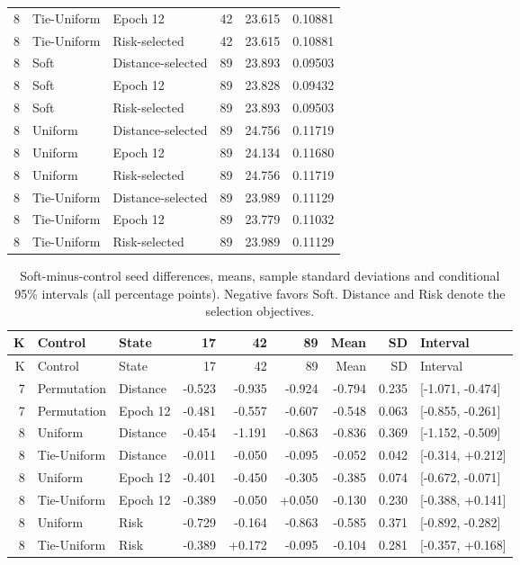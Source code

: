 \begin{longtable}{rlllrr}
8 & Tie-Uniform & Epoch 12 & 42 & 23.615 & 0.10881\\
8 & Tie-Uniform & Risk-selected & 42 & 23.615 & 0.10881\\
8 & Soft & Distance-selected & 89 & 23.893 & 0.09503\\
8 & Soft & Epoch 12 & 89 & 23.828 & 0.09432\\
8 & Soft & Risk-selected & 89 & 23.893 & 0.09503\\
8 & Uniform & Distance-selected & 89 & 24.756 & 0.11719\\
8 & Uniform & Epoch 12 & 89 & 24.134 & 0.11680\\
8 & Uniform & Risk-selected & 89 & 24.756 & 0.11719\\
8 & Tie-Uniform & Distance-selected & 89 & 23.989 & 0.11129\\
8 & Tie-Uniform & Epoch 12 & 89 & 23.779 & 0.11032\\
8 & Tie-Uniform & Risk-selected & 89 & 23.989 & 0.11129\\
\bottomrule\end{longtable}\endgroup

\begingroup\small\setlength{\tabcolsep}{4pt}\setlength{\LTcapwidth}{\linewidth}
\begin{longtable}{rllrrrrrl}
\caption{Soft-minus-control seed differences, means, sample standard deviations and conditional 95\% intervals (all percentage points). Negative favors Soft. Distance and Risk denote the selection objectives.}\label{tab:new-all-contrasts}\\
\toprule K & Control & State & 17 & 42 & 89 & Mean & SD & Interval\\\midrule\endfirsthead
\toprule K & Control & State & 17 & 42 & 89 & Mean & SD & Interval\\\midrule\endhead
7 & Permutation & Distance & -0.523 & -0.935 & -0.924 & -0.794 & 0.235 & [-1.071, -0.474]\\
7 & Permutation & Epoch 12 & -0.481 & -0.557 & -0.607 & -0.548 & 0.063 & [-0.855, -0.261]\\
8 & Uniform & Distance & -0.454 & -1.191 & -0.863 & -0.836 & 0.369 & [-1.152, -0.509]\\
8 & Tie-Uniform & Distance & -0.011 & -0.050 & -0.095 & -0.052 & 0.042 & [-0.314, +0.212]\\
8 & Uniform & Epoch 12 & -0.401 & -0.450 & -0.305 & -0.385 & 0.074 & [-0.672, -0.071]\\
8 & Tie-Uniform & Epoch 12 & -0.389 & -0.050 & +0.050 & -0.130 & 0.230 & [-0.388, +0.141]\\
8 & Uniform & Risk & -0.729 & -0.164 & -0.863 & -0.585 & 0.371 & [-0.892, -0.282]\\
8 & Tie-Uniform & Risk & -0.389 & +0.172 & -0.095 & -0.104 & 0.281 & [-0.357, +0.168]\\
\bottomrule\end{longtable}\endgroup

